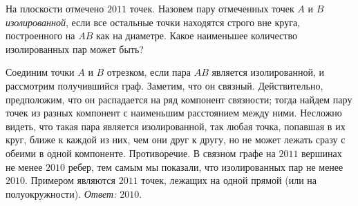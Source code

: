 На плоскости отмечено $2011$ точек.
Назовем пару отмеченных точек $A$ и $B$ \emph{изолированной}, если все остальные
точки находятся строго вне круга, построенного на $AB$ как на диаметре.
Какое наименьшее количество изолированных пар может быть?

\solution
Соединим точки $A$ и $B$ отрезком, если пара $AB$ является изолированной, и
рассмотрим получившийся граф.
Заметим, что он связный.
Действительно, предположим, что он распадается на ряд компонент связности;
тогда найдем пару точек из разных компонент с наименьшим расстоянием между
ними.
Несложно видеть, что такая пара является изолированной, так любая точка,
попавшая в их круг, ближе к каждой из них, чем они друг к другу, но не может
лежать сразу с обеими в одной компоненте.
Противоречие.
В связном графе на $2011$ вершинах не менее $2010$ ребер, тем самым мы
показали, что изолированных пар не менее $2010$.
Примером являются $2011$ точек, лежащих на одной прямой (или на
полуокружности).
\emph{Ответ:} $2010$.


